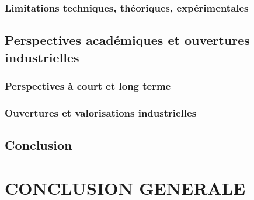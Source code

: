 \documentclass[ twoside,openright,titlepage,numbers=noenddot,headinclude,%
                footinclude=true,cleardoublepage=empty,abstractoff, %
                BCOR=5mm,paper=a4,fontsize=11pt,%
                french,american,%
                ]{scrreprt}
\begin{document}
\section{Limitations techniques, théoriques, expérimentales}

\chapter{Perspectives académiques et ouvertures industrielles}
\section{Perspectives à court et long terme}
\section{Ouvertures et valorisations industrielles}

\chapter*{Conclusion}

\part*{CONCLUSION GENERALE}


\cleardoublepage

\appendix
\cleardoublepage


\end{document}
